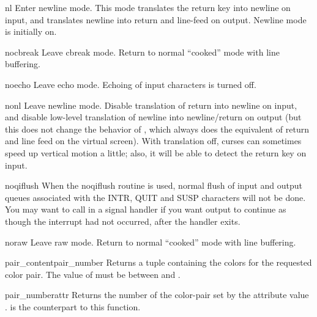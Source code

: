 \begin{funcdesc}{nl}{}
Enter newline mode.  This mode translates the return key into newline
on input, and translates newline into return and line-feed on output.
Newline mode is initially on.
\end{funcdesc}

\begin{funcdesc}{nocbreak}{}
Leave cbreak mode.  Return to normal ``cooked'' mode with line buffering.
\end{funcdesc}

\begin{funcdesc}{noecho}{}
Leave echo mode.  Echoing of input characters is turned off.
\end{funcdesc}

\begin{funcdesc}{nonl}{}
Leave newline mode.  Disable translation of return into newline on
input, and disable low-level translation of newline into
newline/return on output (but this does not change the behavior of
, which always does the equivalent of return and
line feed on the virtual screen).  With translation off, curses can
sometimes speed up vertical motion a little; also, it will be able to
detect the return key on input.
\end{funcdesc}

\begin{funcdesc}{noqiflush}{}
When the noqiflush routine is used, normal flush of input and
output queues associated with the INTR, QUIT and SUSP
characters will not be done.  You may want to call
 in a signal handler if you want output
to continue as though the interrupt had not occurred, after the
handler exits.
\end{funcdesc}

\begin{funcdesc}{noraw}{}
Leave raw mode. Return to normal ``cooked'' mode with line buffering.
\end{funcdesc}

\begin{funcdesc}{pair_content}{pair_number}
Returns a tuple  containing the colors for
the requested color pair.  The value of  must be
between  and .
\end{funcdesc}

\begin{funcdesc}{pair_number}{attr}
Returns the number of the color-pair set by the attribute value
.   is the counterpart to this
function.
\end{funcdesc}


